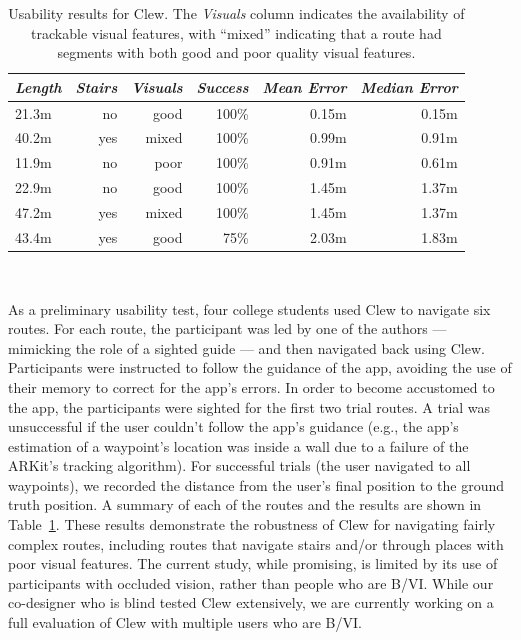\documentclass[chi_draft]{sigchi}
\newcommand{\BVI}{B/VI\xspace}
\begin{document}
\begin{table}
  \centering
  \begin{tabular}{l r r r | r  r}
    {\small \textit{Length}}
      & {\small \textit{Stairs}}
    & {\small \textit{Visuals}}
        & {\small \textit{Success}}
        & {\small \textit{Mean Error}} 
                & {\small \textit{Median Error}} \\
    \midrule
    21.3m & no & good & 100\% & 0.15m & 0.15m \\
    40.2m & yes & mixed & 100\% & 0.99m & 0.91m \\
    11.9m & no & poor & 100\% & 0.91m & 0.61m \\
    22.9m & no & good & 100\% & 1.45m & 1.37m \\
        47.2m & yes & mixed & 100\%& 1.45m & 1.37m \\
            43.4m & yes & good & 75\% & 2.03m & 1.83m \\
  \end{tabular}
  \caption{Usability results for Clew.  The \emph{Visuals} column indicates the availability of trackable visual features, with ``mixed'' indicating that a route had segments with both good and poor quality visual features.}~\label{tab:clewusability}
\end{table}

As a preliminary usability test, four college students used Clew to navigate six routes.  For each route, the participant was led by one of the authors --- mimicking the role of a sighted guide --- and then navigated back using Clew.  Participants were instructed to follow the guidance of the app, avoiding the use of their memory to correct for the app's errors.  In order to become accustomed to the app, the participants were sighted for the first two trial routes.  A trial was unsuccessful if the user couldn't follow the app's guidance (e.g., the app's estimation of a waypoint's location was inside a wall due to a failure of the ARKit's tracking algorithm). For successful trials (the user navigated to all waypoints), we recorded the distance from the user's final position to the ground truth position.  A summary of each of the routes and the results are shown in Table~\ref{tab:clewusability}.  These results demonstrate the robustness of Clew for navigating fairly complex routes, including routes that navigate stairs and/or through places with poor visual features.  The current study, while promising, is limited by its use of participants with occluded vision, rather than people who are \BVI.  While our co-designer who is blind tested Clew extensively, we are currently working on a full evaluation of Clew with multiple users who are \BVI.
\end{document}
